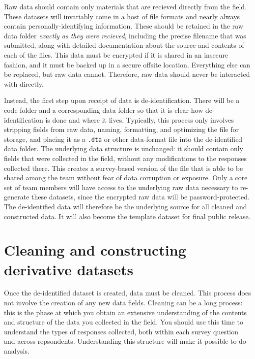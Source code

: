 Raw data should contain only materials that are recieved directly from the field.
These datasets will invariably come in a host of file formats
and nearly always contain personally-identifying information.
These should be retained in the raw data folder
\textit{exactly as they were recieved},
including the precise filename that was submitted,
along with detailed documentation about the source and contents
of each of the files. This data must be encrypted
if it is shared in an insecure fashion,
and it must be backed up in a secure offsite location.
Everything else can be replaced, but raw data cannot.
Therefore, raw data should never be interacted with directly.

Instead, the first step upon receipt of data is de-identification.
There will be a code folder and a corresponding data folder
so that it is clear how de-identification is done and where it lives.
Typically, this process only involves stripping fields from raw data,
naming, formatting, and optimizing the file for storage,
and placing it as a \texttt{.dta} or other data-format file
into the de-identified data folder.
The underlying data structure is unchanged:
it should contain only fields that were collected in the field,
without any modifications to the responses collected there.
This creates a survey-based version of the file that is able
to be shared among the team without fear of data corruption or exposure.
Only a core set of team members will have access to the underlying
raw data necessary to re-generate these datasets,
since the encrypted raw data will be password-protected.
The de-identified data will therefore be the underlying source
for all cleaned and constructed data.
It will also become the template dataset for final public release.


\section{Cleaning and constructing derivative datasets}

Once the de-identified dataset is created, data must be cleaned.
This process does not involve the creation of any new data fields.
Cleaning can be a long process: this is the phase at which
you obtain an extensive understanding of the contents and structure
of the data you collected in the field.
You should use this time to understand the types of responses collected,
both within each survey question and across repsondents.
Understanding this structure will make it possible to do analysis.

